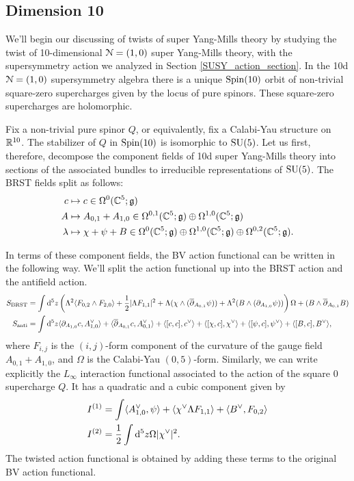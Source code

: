 \documentclass[10pt, oneside]{article}
\begin{document}
\subsection{Dimension 10}
We'll begin our discussing of twists of super Yang-Mills theory by studying the twist of 10-dimensional $\mathcal{N}=(1,0)$ super Yang-Mills theory, with the supersymmetry action we analyzed in Section \ref{SUSY_action_section}.  In the 10d $\mathcal{N}=(1,0)$ supersymmetry algebra there is a unique $\mathrm{Spin}(10)$ orbit of non-trivial square-zero supercharges given by the locus of pure spinors.  These square-zero supercharges are holomorphic.

Fix a non-trivial pure spinor $Q$, or equivalently, fix a Calabi-Yau structure on $\mathbb R^{10}$.  The stabilizer of $Q$ in $\mathrm{Spin}(10)$ is isomorphic to $\mathrm{SU}(5)$.  Let us first, therefore, decompose the component fields of 10d super Yang-Mills theory into sections of the associated bundles to irreducible representations of $\mathrm{SU}(5)$.  The BRST fields split as follows:
\begin{align*}
c &\mapsto c \in \Omega^0(\mathbb C^5; \mathfrak{g}) \\
A &\mapsto A_{0, 1} + A_{1, 0} \in \Omega^{0,1}(\mathbb C^5; \mathfrak{g}) \oplus \Omega^{1,0}(\mathbb C^5; \mathfrak{g})\\
\lambda &\mapsto \chi + \psi + B \in \Omega^0(\mathbb C^5; \mathfrak{g}) \oplus \Omega^{1,0}(\mathbb C^5; \mathfrak{g}) \oplus \Omega^{0,2}(\mathbb C^5; \mathfrak{g}). 
\end{align*}

In terms of these component fields, the BV action functional can be written in the following way.  We'll split the action functional up into the BRST action and the antifield action.
\begin{align*}
S_{\mathrm{BRST}} &= \int {\rm d}^5z \left(\Lambda^2 \langle F_{0,2} \wedge F_{2,0}\rangle + \frac 12 |\Lambda F_{1,1}|^2 + \Lambda( \chi \wedge (\overline{\partial}_{A_{0,1}} \psi))  + \Lambda^2(B \wedge (\partial_{A_{1,0}} \psi))\right) \Omega + (B \wedge \overline{\partial}_{A_{0,1}} B) \\
S_{\mathrm{anti}} &= \int {\rm d}^5z \langle \partial_{A_{1,0}}c, A_{1,0}^\vee \rangle +  \langle \overline{\partial}_{A_{0,1}}c, A_{0,1}^\vee \rangle + \langle [c,c], c^\vee \rangle + \langle [\chi,c], \chi^\vee \rangle + \langle [\psi,c], \psi^\vee \rangle + \langle [B,c], B^\vee \rangle,
\end{align*}
where $F_{i,j}$ is the $(i,j)$-form component of the curvature of the gauge field $A_{0, 1} + A_{1, 0}$, and $\Omega$ is the Calabi-Yau $(0,5)$-form.  Similarly, we can write explicitly the $L_\infty$ interaction functional associated to the action of the square 0 supercharge $Q$.  It has a quadratic and a cubic component given by
\begin{align*}
I^{(1)} &= \int \langle A_{1,0}^\vee, \psi \rangle + \langle \chi^\vee \Lambda F_{1,1} \rangle + \langle B^\vee, F_{0,2} \rangle \\
I^{(2)} &= \frac 12 \int {\rm d}^5z \Omega |\chi^\vee|^2.
\end{align*}
The twisted action functional is obtained by adding these terms to the original BV action functional.
\end{document}
